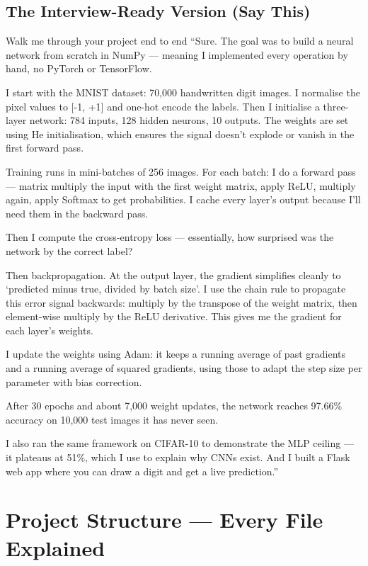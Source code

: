 \documentclass[12pt, a4paper]{article}
\begin{document}
\subsection{The Interview-Ready Version (Say This)}

\begin{interviewbox}{Walk me through your project end to end}
``Sure. The goal was to build a neural network from scratch in NumPy --- meaning I implemented every operation by hand, no PyTorch or TensorFlow.

I start with the MNIST dataset: 70,000 handwritten digit images. I normalise the pixel values to [-1, +1] and one-hot encode the labels. Then I initialise a three-layer network: 784 inputs, 128 hidden neurons, 10 outputs. The weights are set using He initialisation, which ensures the signal doesn't explode or vanish in the first forward pass.

Training runs in mini-batches of 256 images. For each batch: I do a forward pass --- matrix multiply the input with the first weight matrix, apply ReLU, multiply again, apply Softmax to get probabilities. I cache every layer's output because I'll need them in the backward pass.

Then I compute the cross-entropy loss --- essentially, how surprised was the network by the correct label?

Then backpropagation. At the output layer, the gradient simplifies cleanly to `predicted minus true, divided by batch size'. I use the chain rule to propagate this error signal backwards: multiply by the transpose of the weight matrix, then element-wise multiply by the ReLU derivative. This gives me the gradient for each layer's weights.

I update the weights using Adam: it keeps a running average of past gradients and a running average of squared gradients, using those to adapt the step size per parameter with bias correction.

After 30 epochs and about 7,000 weight updates, the network reaches 97.66\% accuracy on 10,000 test images it has never seen.

I also ran the same framework on CIFAR-10 to demonstrate the MLP ceiling --- it plateaus at 51\%, which I use to explain why CNNs exist. And I built a Flask web app where you can draw a digit and get a live prediction.''
\end{interviewbox}

\section{Project Structure --- Every File Explained}
\end{document}
